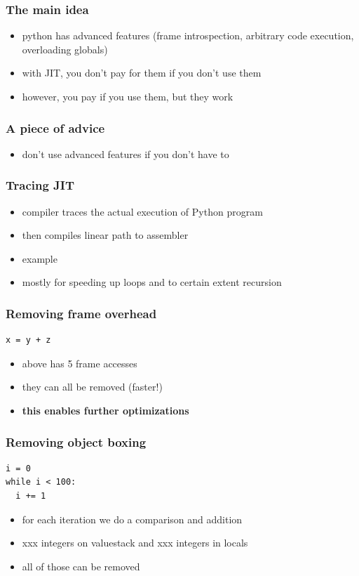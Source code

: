 \documentclass[utf8x, 14pt]{beamer}
\begin{document}
\begin{frame}
  \frametitle{The main idea}
  \begin{itemize}
    \item python has advanced features (frame introspection,
      arbitrary code execution, overloading globals)
    \item with JIT, you don't pay for them if you don't use
      them
    \item however, you pay if you use them, but they work
  \end{itemize}
\end{frame}

\begin{frame}
  \frametitle{A piece of advice}
  \begin{itemize}
    \item don't use advanced features if you don't have to
  \end{itemize}
\end{frame}

\begin{frame}
  \frametitle{Tracing JIT}
  \begin{itemize}
    \item compiler traces the actual execution of Python program
    \item then compiles linear path to assembler
    \item example
    \item mostly for speeding up loops and to certain extent
      recursion
  \end{itemize}
\end{frame}

\begin{frame}[fragile]
  \frametitle{Removing frame overhead}
  \begin{verbatim}
x = y + z
  \end{verbatim}
  \begin{itemize}
    \item above has 5 frame accesses
    \item they can all be removed (faster!)
      \pause
    \item {\bf this enables further optimizations}
  \end{itemize}
\end{frame}

\begin{frame}[fragile]
  \frametitle{Removing object boxing}
  \begin{verbatim}
i = 0
while i < 100:
  i += 1
  \end{verbatim}
  \begin{itemize}
    \item for each iteration we do a comparison and addition
    \item xxx integers on valuestack and xxx integers in locals
    \item all of those can be removed
  \end{itemize}
\end{frame}
\end{document}

